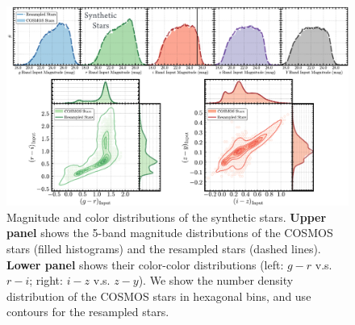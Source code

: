 \documentclass[useamsfonts]{pasj01}
\begin{document}
\begin{figure}
    \begin{center}
        \includegraphics[width=\textwidth]{fig/synpipe_star_sample}
    \end{center}
    \caption{
        Magnitude and color distributions of the synthetic stars. 
        \textbf{Upper panel} shows the 5-band magnitude distributions of the COSMOS 
        stars (filled histograms) and the resampled stars (dashed lines). 
        \textbf{Lower panel} shows their color-color distributions 
        (left: $g-r$ v.s. $r-i$; right: $i-z$ v.s. $z-y$). 
        We show the number density distribution of the COSMOS stars in hexagonal bins, 
        and use contours for the resampled stars.
        }
    \label{fig:star_sample}
\end{figure}
\end{document}
